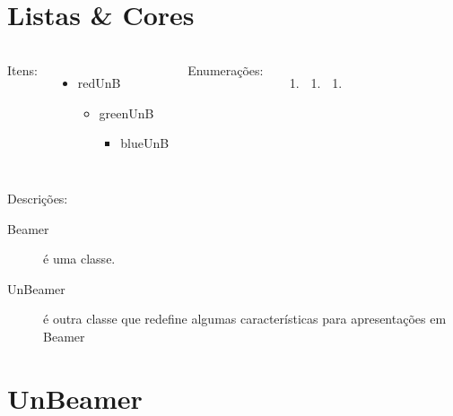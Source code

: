 \documentclass{UnBeamer}%
\begin{document}
  \section{Listas \& Cores}%
  \begin{frame}%
    \begin{columns}[T]%
        Itens:\\%
        \begin{itemize}%
          \item {\color{redUnB}redUnB}%
          \begin{itemize}%
            \item {\color{greenUnB}greenUnB}%
            \begin{itemize}%
              \item {\color{blueUnB}blueUnB}%
            \end{itemize}%
          \end{itemize}%
        \end{itemize}%
        Enumerações:%
        \begin{enumerate}%
          \item \colorbox{redUnB}{\color{white}{redUnB}}%
          \begin{enumerate}%
            \item \colorbox{greenUnB}{\color{white}{greenUnB}}%
            \begin{enumerate}%
              \item \colorbox{blueUnB}{\color{white}{blueUnB}}%
            \end{enumerate}%
          \end{enumerate}%
        \end{enumerate}%
    \end{columns}%
    \vfill%
    Descrições:%
    \begin{description}%
      \item[Beamer] é uma classe.%
      \item[UnBeamer] é outra classe que redefine algumas características%
      para apresentações em Beamer%
    \end{description}%
  \end{frame}%

  \section{UnBeamer}%
\end{document}

